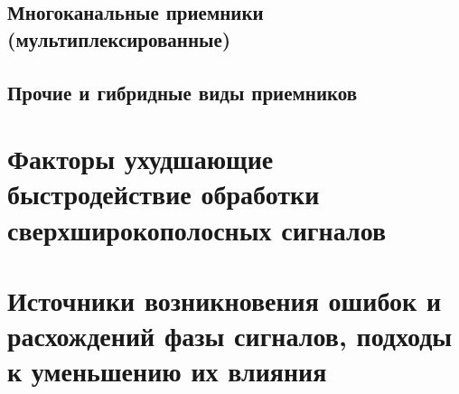 \subsection{Многоканальные приемники (мультиплексированные)}

\subsection{Прочие и гибридные виды приемников}

\section{Факторы ухудшающие быстродействие обработки сверхширокополосных сигналов}

\section{Источники возникновения ошибок и расхождений фазы сигналов, подходы к уменьшению их влияния}